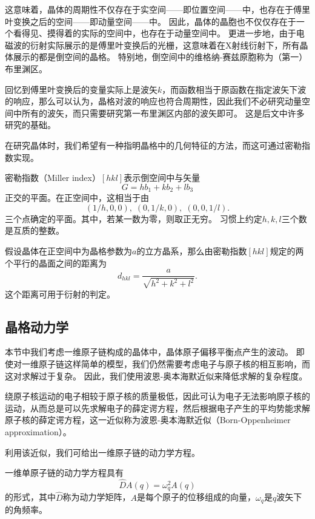 这意味着，晶体的周期性不仅存在于实空间——即位置空间——中，也存在于傅里叶变换之后的空间——即动量空间——中。
因此，晶体的晶胞也不仅仅存在于一个看得见、摸得着的实际的空间中，也存在于动量空间中。
更进一步地，由于电磁波的衍射实际展示的是傅里叶变换后的光栅，这意味着在X射线衍射下，所有晶体展示的都是倒空间的晶格。
特别地，倒空间中的维格纳-赛兹原胞称为（第一）布里渊区。

回忆到傅里叶变换后的变量实际上是波矢$k$，而函数相当于原函数在指定波矢下波的响应，那么可以认为，晶格对波的响应也符合周期性，因此我们不必研究动量空间中所有的波矢，而只需要研究第一布里渊区内部的波矢即可。
这是后文中许多研究的基础。

在研究晶体时，我们希望有一种指明晶格中的几何特征的方法，而这可通过密勒指数实现。

\begin{definition}
    密勒指数（Miller index）$[hkl]$表示倒空间中与矢量
    \begin{equation}
        G = h b_1 + k b_2 + l b_3
    \end{equation}
    正交的平面。在正空间中，这相当于由
    \begin{equation}
        (1/h, 0, 0), \; (0, 1/k, 0), \; (0, 0, 1/l).
    \end{equation}
    三个点确定的平面。其中，若某一数为零，则取正无穷。
    习惯上约定$h,k,l$三个数是互质的整数。
\end{definition}

假设晶体在正空间中为晶格参数为$a$的立方晶系，那么由密勒指数$[hkl]$规定的两个平行的晶面之间的距离为
\begin{equation}
    d_{hkl} = \frac{a}{\sqrt{h^2 + k^2 + l^2}}.
\end{equation}
这个距离可用于衍射的判定。

\subsection{晶格动力学}
本节中我们考虑一维原子链构成的晶体中，晶体原子偏移平衡点产生的波动。
即使对一维原子链这样简单的模型，我们仍然需要考虑电子与原子核的相互影响，而这对求解过于复杂。
因此，我们使用波恩-奥本海默近似来降低求解的复杂程度。
\begin{theorem}
    绕原子核运动的电子相较于原子核的质量极低，因此可认为电子无法影响原子核的运动，从而总是可以先求解电子的薛定谔方程，然后根据电子产生的平均势能求解原子核的薛定谔方程，这一近似称为波恩-奥本海默近似（Born-Oppenheimer approximation）。
\end{theorem}

利用该近似，我们可给出一维原子链的动力学方程。
\begin{proposition}
    一维单原子链的动力学方程具有
    \begin{equation}
        \hat D A(q) = \omega_q^2 A(q)
    \end{equation}
    的形式，其中$\hat D$称为动力学矩阵，$A$是每个原子的位移组成的向量，$\omega_q$是$q$波矢下的角频率。
\end{proposition}


